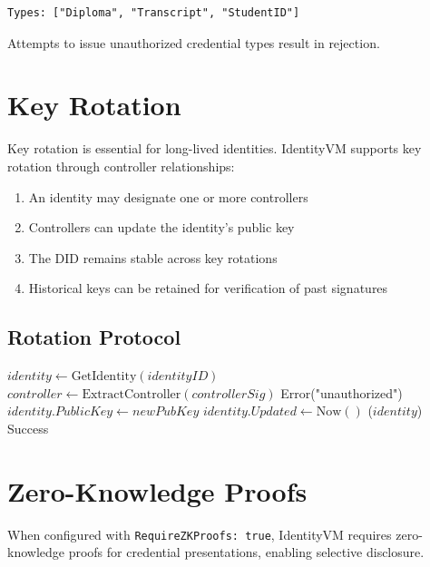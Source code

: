 \documentclass[11pt,twocolumn]{article}
\begin{document}
\begin{lstlisting}[basicstyle=\ttfamily\small]
Types: ["Diploma", "Transcript", "StudentID"]
\end{lstlisting}

Attempts to issue unauthorized credential types result in rejection.

\section{Key Rotation}

Key rotation is essential for long-lived identities. IdentityVM supports key rotation through controller relationships:

\begin{enumerate}
\item An identity may designate one or more controllers
\item Controllers can update the identity's public key
\item The DID remains stable across key rotations
\item Historical keys can be retained for verification of past signatures
\end{enumerate}

\subsection{Rotation Protocol}

\begin{algorithm}
\caption{Key Rotation}
\label{alg:key-rotation}
\begin{algorithmic}[1]
    \State $identity \gets \text{GetIdentity}(identityID)$
    \State $controller \gets \text{ExtractController}(controllerSig)$
        \State \Return Error("unauthorized")
    \EndIf
    \State $identity.PublicKey \gets newPubKey$
    \State $identity.Updated \gets \text{Now}()$
    \State {}($identity$)
    \State \Return Success
\EndProcedure
\end{algorithmic}
\end{algorithm}

\section{Zero-Knowledge Proofs}

When configured with \texttt{RequireZKProofs: true}, IdentityVM requires zero-knowledge proofs for credential presentations, enabling selective disclosure.
\end{document}
